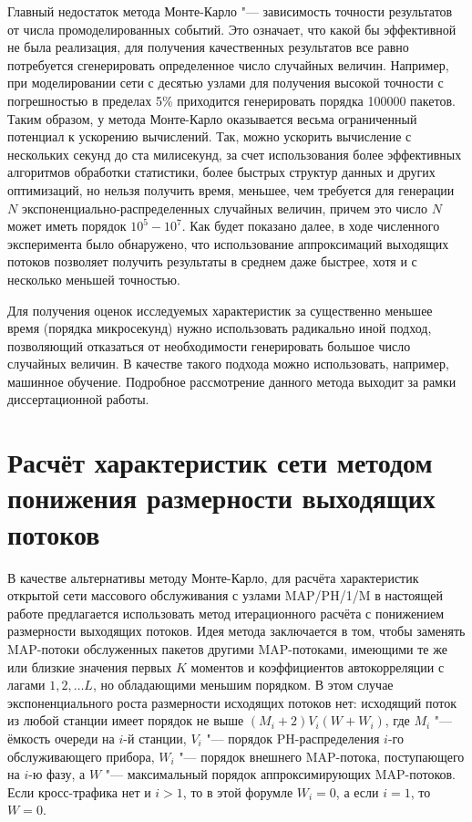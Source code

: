 Главный недостаток метода Монте-Карло "--- зависимость точности результатов от числа промоделированных событий. Это означает, что какой бы эффективной не была реализация, для получения качественных результатов все равно потребуется сгенерировать определенное число случайных величин. Например, при моделировании сети с десятью узлами для получения высокой точности с погрешностью в пределах 5\% приходится генерировать порядка 100000 пакетов. Таким образом, у метода Монте-Карло оказывается весьма ограниченный потенциал к ускорению вычислений. Так, можно ускорить вычисление с нескольких секунд до ста милисекунд, за счет использования более эффективных алгоритмов обработки статистики, более быстрых структур данных и других оптимизаций, но нельзя получить время, меньшее, чем требуется для генерации $N$ экспоненциально-распределенных случайных величин, причем это число $N$ может иметь порядок $10^5-10^7$. Как будет показано далее, в ходе численного эксперимента было обнаружено, что использование аппроксимаций выходящих потоков позволяет получить результаты в среднем даже быстрее, хотя и с несколько меньшей точностью.

Для получения оценок исследуемых характеристик за существенно меньшее время (порядка микросекунд) нужно использовать радикально иной подход, позволяющий отказаться от необходимости генерировать большое число случайных величин. В качестве такого подхода можно использовать, например, машинное обучение. Подробное рассмотрение данного метода выходит за рамки диссертационной работы.


\section{Расчёт характеристик сети методом понижения размерности выходящих потоков}\label{sec:ch4_approx}

В качестве альтернативы методу Монте-Карло, для расчёта характеристик открытой сети массового обслуживания с узлами MAP/PH/1/M в настоящей работе предлагается использовать метод итерационного расчёта с понижением размерности выходящих потоков. Идея метода заключается в том, чтобы заменять MAP-потоки обслуженных пакетов другими MAP-потоками, имеющими те же или близкие значения первых $K$ моментов и коэффициентов автокорреляции с лагами $1, 2, \dots L$, но обладающими меньшим порядком. В этом случае экспоненциального роста размерности исходящих потоков нет: исходящий поток из любой станции имеет порядок не выше $(M_i + 2) V_i (W + W_i)$, где $M_i$ "--- ёмкость очереди на $i$-й станции, $V_i$ "--- порядок PH-распределения $i$-го обслуживающего прибора, $W_i$ "--- порядок внешнего MAP-потока, поступающего на $i$-ю фазу, а $W$ "--- максимальный порядок аппроксимирующих MAP-потоков. Если кросс-трафика нет и $i > 1$, то в этой форумле $W_i = 0$, а если $i = 1$, то $W = 0$.

